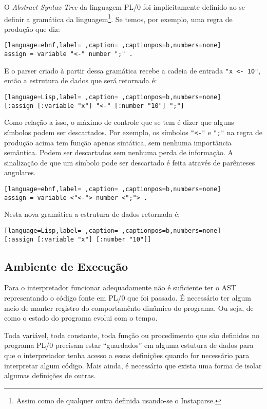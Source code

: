 \documentclass{scrartcl}
\begin{document}
O \emph{Abstract Syntax Tree} da linguagem PL/0 foi implicitamente definido ao se
definir a gramática da linguagem\footnote{Assim como de qualquer outra definida usando-se o Instaparse.}. Se temos, por exemplo, uma regra de
produção que diz:
\begin{lstlisting}[language=ebnf,label= ,caption= ,captionpos=b,numbers=none]
assign = variable "<-" number ";" .
\end{lstlisting}
E o parser criado à partir dessa gramática recebe a cadeia de entrada \texttt{"x <-
10"}, então a estrutura de dados que será retornada é:
\begin{lstlisting}[language=Lisp,label= ,caption= ,captionpos=b,numbers=none]
[:assign [:variable "x"] "<-" [:number "10"] ";"]
\end{lstlisting}
Como relação a isso, o máximo de controle que se tem é dizer que alguns símbolos
podem ser descartados. Por exemplo, os símbolos \texttt{"<-"} e \texttt{";"} na regra de
produção acima tem função apenas sintática, sem nenhuma importância semântica.
Podem ser descartados sem nenhuma perda de informação. A sinalização de que um
símbolo pode ser descartado é feita através de parênteses angulares.
\begin{lstlisting}[language=ebnf,label= ,caption= ,captionpos=b,numbers=none]
assign = variable <"<-"> number <";"> .
\end{lstlisting}
Nesta nova gramática a estrutura de dados retornada é:
\begin{lstlisting}[language=Lisp,label= ,caption= ,captionpos=b,numbers=none]
[:assign [:variable "x"] [:number "10"]]
\end{lstlisting}


\subsection{Ambiente de Execução}
\label{sec:org28905c0}

Para o interpretador funcionar adequadamente não é suficiente ter o AST
representando o código fonte em PL/0 que foi passado. É necessário ter algum
meio de manter registro do comportamênto dinâmico do programa. Ou seja, de como
o estado do programa evolui com o tempo.

Toda variável, toda constante, toda função ou procedimento que são definidos no
programa PL/0 precisam estar “guardados” em alguma estutura de dados para que o
interpretador tenha acesso a essas definições quando for necessário para
interpretar algum código. Mais ainda, é necessário que exista uma forma de
isolar algumas definições de outras.
\end{document}
